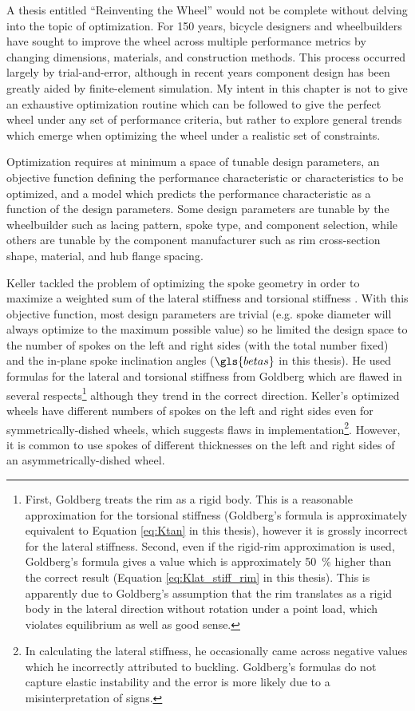 \documentclass[\rootdir/thesis.tex]{subfiles}
\begin{document}
A thesis entitled ``Reinventing the Wheel'' would not be complete without delving into the topic of optimization. For 150 years, bicycle designers and wheelbuilders have sought to improve the wheel across multiple performance metrics by changing dimensions, materials, and construction methods. This process occurred largely by trial-and-error, although in recent years component design has been greatly aided by finite-element simulation. My intent in this chapter is not to give an exhaustive optimization routine which can be followed to give the perfect wheel under any set of performance criteria, but rather to explore general trends which emerge when optimizing the wheel under a realistic set of constraints.

Optimization requires at minimum a space of tunable design parameters, an objective function defining the performance characteristic or characteristics to be optimized, and a model which predicts the performance characteristic as a function of the design parameters. Some design parameters are tunable by the wheelbuilder such as lacing pattern, spoke type, and component selection, while others are tunable by the component manufacturer such as rim cross-section shape, material, and hub flange spacing.

Keller tackled the problem of optimizing the spoke geometry in order to maximize a weighted sum of the lateral stiffness and torsional stiffness \cite{Keller2013}. With this objective function, most design parameters are trivial (e.g. spoke diameter will always optimize to the maximum possible value) so he limited the design space to the number of spokes on the left and right sides (with the total number fixed) and the in-plane spoke inclination angles ($\gls{betas}$ in this thesis). He used formulas for the lateral and torsional stiffness from Goldberg \cite{Goldberg1984} which are flawed in several respects\footnote{First, Goldberg treats the rim as a rigid body. This is a reasonable approximation for the torsional stiffness (Goldberg's formula is approximately equivalent to Equation \ref{eq:Ktan} in this thesis), however it is grossly incorrect for the lateral stiffness. Second, even if the rigid-rim approximation is used, Goldberg's formula gives a value which is approximately \SI{50}{\percent} higher than the correct result (Equation \ref{eq:Klat_stiff_rim} in this thesis). This is apparently due to Goldberg's assumption that the rim translates as a rigid body in the lateral direction without rotation under a point load, which violates equilibrium as well as good sense.} although they trend in the correct direction. Keller's optimized wheels have different numbers of spokes on the left and right sides even for symmetrically-dished wheels, which suggests flaws in implementation\footnote{In calculating the lateral stiffness, he occasionally came across negative values which he incorrectly attributed to buckling. Goldberg's formulas do not capture elastic instability and the error is more likely due to a misinterpretation of signs.}. However, it is common to use spokes of different thicknesses on the left and right sides of an asymmetrically-dished wheel.
\end{document}
